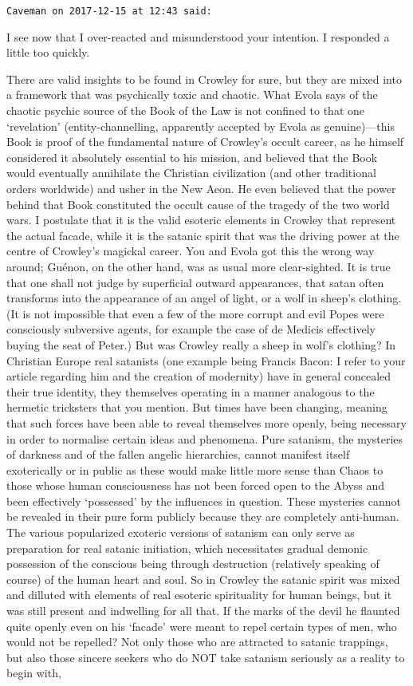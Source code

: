 \begin{footnotesize}
\begin{sffamily}
\hfill

\texttt{Caveman on 2017-12-15 at 12:43 said:}

I see now that I over-reacted and misunderstood your intention. I responded a little too quickly.

There are valid insights to be found in Crowley for sure, but they are mixed into a framework that was psychically toxic and chaotic. What Evola says of the chaotic psychic source of the Book of the Law is not confined to that one `revelation' (entity-channelling, apparently accepted by Evola as genuine)---this Book is proof of the fundamental nature of Crowley's occult career, as he himself considered it absolutely essential to his mission, and believed that the Book would eventually annihilate the Christian civilization (and other traditional orders worldwide) and usher in the New Aeon. He even believed that the power behind that Book constituted the occult cause of the tragedy of the two world wars. I postulate that it is the valid esoteric elements in Crowley that represent the actual facade, while it is the satanic spirit that was the driving power at the centre of Crowley's magickal career. You and Evola got this the wrong way around; Guénon, on the other hand, was as usual more clear-sighted. It is true that one shall not judge by superficial outward appearances, that satan often transforms into the appearance of an angel of light, or a wolf in sheep's clothing. (It is not impossible that even a few of the more corrupt and evil Popes were consciously subversive agents, for example the case of de Medicis effectively buying the seat of Peter.) But was Crowley really a sheep in wolf's clothing? In Christian Europe real satanists (one example being Francis Bacon: I refer to your article regarding him and the creation of modernity) have in general concealed their true identity, they themselves operating in a manner analogous to the hermetic tricksters that you mention. But times have been changing, meaning that such forces have been able to reveal themselves more openly, being necessary in order to normalise certain ideas and phenomena. Pure satanism, the mysteries of darkness and of the fallen angelic hierarchies, cannot manifest itself exoterically or in public as these would make little more sense than Chaos to those whose human consciousness has not been forced open to the Abyss and been effectively `possessed' by the influences in question. These mysteries cannot be revealed in their pure form publicly because they are completely anti-human. The various popularized exoteric versions of satanism can only serve as preparation for real satanic initiation, which necessitates gradual demonic possession of the conscious being through destruction (relatively speaking of course) of the human heart and soul. So in Crowley the satanic spirit was mixed and dilluted with elements of real esoteric spirituality for human beings, but it was still present and indwelling for all that. If the marks of the devil he flaunted quite openly even on his `facade' were meant to repel certain types of men, who would not be repelled? Not only those who are attracted to satanic trappings, but also those sincere seekers who do NOT take satanism seriously as a reality to begin with, 
\end{sffamily}
\end{footnotesize}
